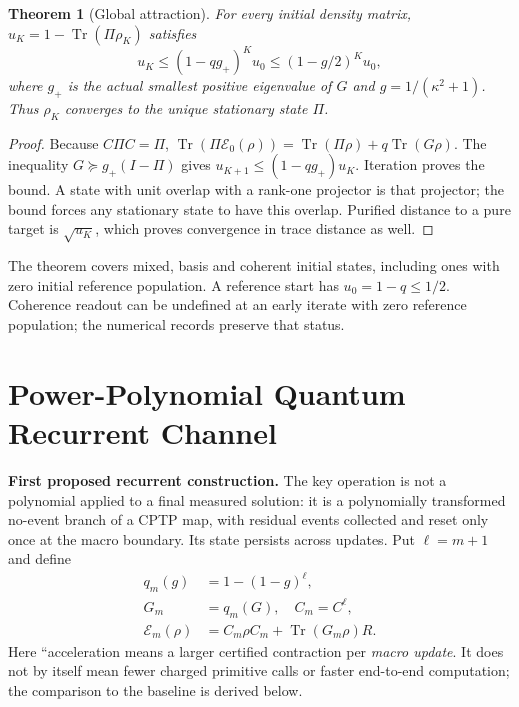 \documentclass{ieeeaccess}
\newtheorem{theorem}{Theorem}\newtheorem{lemma}{Lemma}
\newcommand{\Tr}{\operatorname{Tr}}\newcommand{\E}{\mathcal E}
\begin{document}
\begin{theorem}[Global attraction]\label{thm:base}
For every initial density matrix, $u_K=1-\Tr(\Pi\rho_K)$ satisfies
\begin{equation}\label{eq:basebound}
u_K\le(1-qg_+)^K u_0\le(1-g/2)^K u_0,
\end{equation}
where $g_+$ is the actual smallest positive eigenvalue of $G$ and $g=1/(\kappa^2+1)$. Thus $\rho_K$ converges to the unique stationary state $\Pi$.
\end{theorem}
\begin{proof}
Because $C\Pi C=\Pi$, $\Tr(\Pi\E_0(\rho))=\Tr(\Pi\rho)+q\Tr(G\rho)$. The inequality $G\succeq g_+(I-\Pi)$ gives $u_{K+1}\le(1-qg_+)u_K$. Iteration proves the bound. A state with unit overlap with a rank-one projector is that projector; the bound forces any stationary state to have this overlap. Purified distance to a pure target is $\sqrt{u_K}$, which proves convergence in trace distance as well.
\end{proof}
The theorem covers mixed, basis and coherent initial states, including ones with zero initial reference population. A reference start has $u_0=1-q\le1/2$. Coherence readout can be undefined at an early iterate with zero reference population; the numerical records preserve that status.


\section{Power-Polynomial Quantum Recurrent Channel}\label{sec:power}
\textbf{First proposed recurrent construction.} The key operation is not a polynomial applied to a final measured solution: it is a polynomially transformed no-event branch of a CPTP map, with residual events collected and reset only once at the macro boundary. Its state persists across updates.
Put $\ell=m+1$ and define
\begin{align}
q_m(g)&=1-(1-g)^{\ell},\label{eq:response}\\
G_m&=q_m(G),\quad C_m=C^{\ell},\label{eq:transform}\\
\E_m(\rho)&=C_m\rho C_m+\Tr(G_m\rho)R.\label{eq:accelerated}
\end{align}
Here ``acceleration means a larger certified contraction per \emph{macro update}. It does not by itself mean fewer charged primitive calls or faster end-to-end computation; the comparison to the baseline is derived below.
\end{document}
